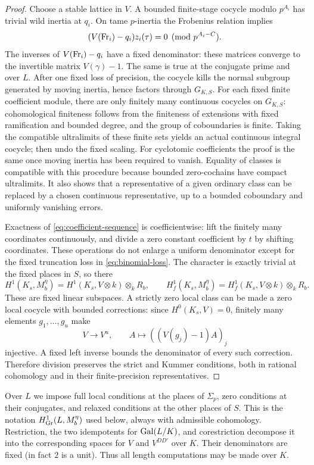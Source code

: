\begin{proof}
Choose a stable lattice in $V$.  A bounded finite-stage cocycle
modulo $p^{A_i}$ has trivial wild inertia at $q_i$.  On tame
$p$-inertia the Frobenius relation implies
\[
 (V(\operatorname{Fr}_i)-q_i)z_i(\tau)=0\pmod {p^{A_i-C}}.
\]
The inverses of $V(\operatorname{Fr}_i)-q_i$ have a fixed denominator: these
matrices converge to the invertible matrix $V(\gamma)-1$.
The same is true at the conjugate prime and over $L$.  After one
fixed loss of precision, the cocycle kills the normal subgroup
generated by moving inertia, hence factors through $G_{K,S}$.
For each fixed finite coefficient module, there are only finitely
many continuous cocycles on $G_{K,S}$: cohomological finiteness
follows from the finiteness of extensions with fixed ramification
and bounded degree, and the group of coboundaries is finite.
Taking the compatible ultralimits of these finite sets yields an
actual continuous integral cocycle; then undo the fixed scaling.
For cyclotomic coefficients the proof is the same once moving
inertia has been required to vanish.  Equality of classes is
compatible with this procedure because bounded zero-cochains
have compact ultralimits.  It also shows that a representative of
a given ordinary class can be replaced by a chosen continuous
representative, up to a bounded coboundary and uniformly vanishing
errors.

Exactness of \cref{eq:coefficient-sequence} is coefficientwise:
lift the finitely many coordinates continuously, and divide a
zero constant coefficient by $t$ by shifting coordinates.  These
operations do not enlarge a uniform denominator except for the
fixed truncation loss in \cref{eq:binomial-loss}.  The character is
exactly trivial at the fixed places in $S$, so there
\[
 H^1(K_s,M_b^{\eta})=H^1(K_s,V\otimes k)\otimes_k R_b,
 \qquad
 H^1_f(K_s,M_b^{\eta})=H^1_f(K_s,V\otimes k)\otimes_k R_b.
\]
These are fixed linear subspaces.  A strictly zero local class
can be made a zero local cocycle with bounded corrections: since
$H^0(K_s,V)=0$, finitely many elements $g_1,\ldots,g_u$ make
\[
 V\longrightarrow V^u,\qquad
 A\longmapsto((V(g_j)-1)A)_j
\]
injective.  A fixed left inverse bounds the denominator of every
such correction.  Therefore division preserves the strict and
Kummer conditions, both in rational cohomology and in their
finite-precision representatives.
\end{proof}

Over $L$ we impose full local conditions at the places of
$\Sigma_p$, zero conditions at their conjugates, and relaxed
conditions at the other places of $S$.  This is the notation
$H^1_{\mathrm{Gr}}(L,M_b^{\eta})$ used below, always with admissible cohomology.
Restriction, the two idempotents for $\operatorname{Gal}(L/K)$, and corestriction
decompose it into the corresponding spaces for $V$ and $V^{DD'}$
over $K$.  Their denominators are fixed (in fact $2$ is a unit).
Thus all length computations may be made over $K$.

